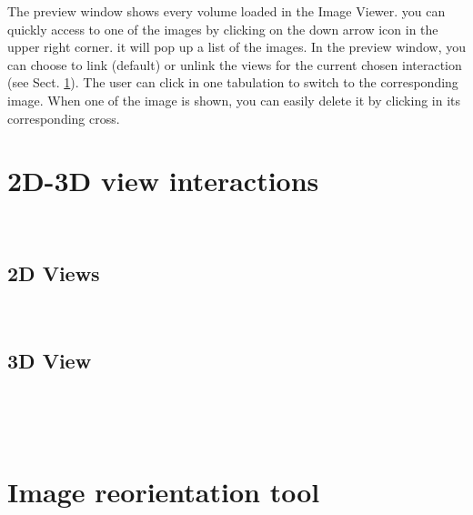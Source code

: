 The preview window shows every volume loaded in the Image Viewer. you can quickly access
to one of the images by clicking on the down arrow icon in the upper right corner. it will
pop up a list of the images. 
In the preview window, you can choose to link (default) or unlink the views for the
current chosen interaction (see Sect. \ref{sec:2d3dviewinteractions}). The user can click
in one tabulation to switch to the corresponding image. When one of the image is shown,
you can easily delete it by clicking in its corresponding cross. 
\ \\

\section{2D-3D view interactions}
\label{sec:2d3dviewinteractions}
\ \\

\subsection{2D Views}
\label{sec:2dview}
\ \\

\ifalone

\else
	
\fi

\subsection{3D View}
\label{sec:3dview}
\ \\

\ifalone

\else
	
\fi

\ \\


\section{Image reorientation tool}
\label{sec:imagereorientation}
\ \\

\ifalone

\else
	
\fi


